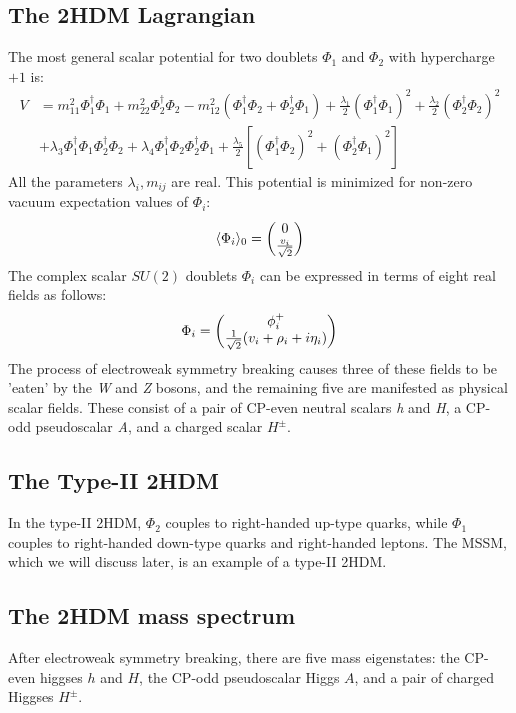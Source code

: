 \subsection{The 2HDM Lagrangian}
The most general scalar potential for two doublets $\Phi_1$ and $\Phi_2$ with hypercharge $+1$ is:
\begin{align*}
  V &= m_{11}^2\Phi_1^\dagger\Phi_1 + m_{22}^2\Phi_2^\dagger\Phi_2 - m_{12}^2\left(\Phi_1^\dagger\Phi_2 + \Phi_2^\dagger\Phi_1 \right) + \frac{\lambda_1}{2}\left(\Phi_1^\dagger\Phi_1 \right)^2 + \frac{\lambda_2}{2}\left(\Phi_2^\dagger\Phi_2 \right)^2\\
&  +\lambda_3\Phi_1^\dagger\Phi_1 \Phi_2^\dagger\Phi_2 + \lambda_4\Phi_1^\dagger\Phi_2 \Phi_2^\dagger\Phi_1 + \frac{\lambda_5}{2}\left[\left(\Phi_1^\dagger\Phi_2 \right)^2+\left(\Phi_2^\dagger\Phi_1\right)^2 \right]
\end{align*}
All the parameters $\lambda_i, m_{ij}$ are real. This potential is minimized for non-zero vacuum expectation values of $\Phi_i$:
\begin{align}
\langle\Phi_i\rangle_0=\begin{pmatrix} 0 \\ \frac{v_i}{\sqrt{2}}\end{pmatrix}
\end{align}
The complex scalar $SU(2)$ doublets $\Phi_i$ can be expressed in terms of eight real fields as follows:
\begin{equation}
\Phi_i = \begin{pmatrix} \phi_i^+ \\ \frac{1}{\sqrt{2}}(v_i+\rho_i+i\eta_i)\end{pmatrix}
\end{equation}
The process of electroweak symmetry breaking causes three of these fields to be 'eaten' by the \emph{W} and \emph{Z} bosons, and the remaining five are manifested as physical scalar fields. These consist of a pair of CP-even neutral scalars \emph{h} and \emph{H}, a CP-odd pseudoscalar \emph{A}, and a charged scalar $H^\pm$.

\subsection{The Type-II 2HDM}

In the type-II 2HDM, $\Phi_2$ couples to right-handed up-type quarks, while $\Phi_1$ couples to right-handed down-type quarks and right-handed leptons. The MSSM, which we will discuss later, is an example of a type-II 2HDM.

\subsection{The 2HDM mass spectrum}

After electroweak symmetry breaking, there are five mass eigenstates: the CP-even higgses $h$ and $H$, the CP-odd pseudoscalar Higgs $A$, and a pair of charged Higgses $H^\pm$.

